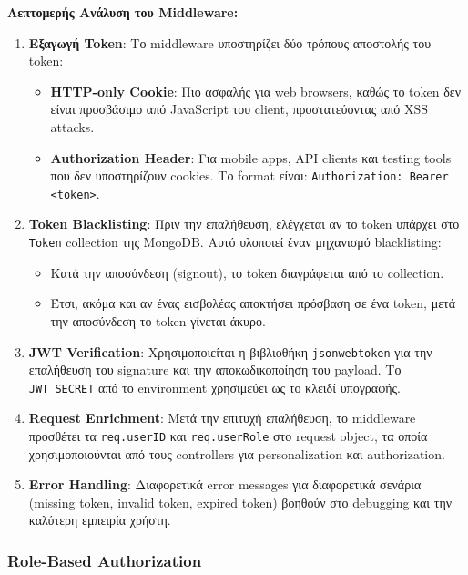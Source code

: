 \documentclass[a4paper,12pt]{article}
\begin{document}
\textbf{Λεπτομερής Ανάλυση του Middleware:}

\begin{enumerate}
    \item \textbf{Εξαγωγή Token}: Το middleware υποστηρίζει δύο τρόπους αποστολής του token:
    \begin{itemize}
        \item \textbf{HTTP-only Cookie}: Πιο ασφαλής για web browsers, καθώς το token δεν είναι προσβάσιμο από JavaScript του client, προστατεύοντας από XSS attacks.
        \item \textbf{Authorization Header}: Για mobile apps, API clients και testing tools που δεν υποστηρίζουν cookies. Το format είναι: \texttt{Authorization: Bearer <token>}.
    \end{itemize}
    
    \item \textbf{Token Blacklisting}: Πριν την επαλήθευση, ελέγχεται αν το token υπάρχει στο \texttt{Token} collection της MongoDB. Αυτό υλοποιεί έναν μηχανισμό blacklisting:
    \begin{itemize}
        \item Κατά την αποσύνδεση (signout), το token διαγράφεται από το collection.
        \item Έτσι, ακόμα και αν ένας εισβολέας αποκτήσει πρόσβαση σε ένα token, μετά την αποσύνδεση το token γίνεται άκυρο.
    \end{itemize}
    
    \item \textbf{JWT Verification}: Χρησιμοποιείται η βιβλιοθήκη \texttt{jsonwebtoken} για την επαλήθευση του signature και την αποκωδικοποίηση του payload. Το \texttt{JWT\_SECRET} από το environment χρησιμεύει ως το κλειδί υπογραφής.
    
    \item \textbf{Request Enrichment}: Μετά την επιτυχή επαλήθευση, το middleware προσθέτει τα \texttt{req.userID} και \texttt{req.userRole} στο request object, τα οποία χρησιμοποιούνται από τους controllers για personalization και authorization.
    
    \item \textbf{Error Handling}: Διαφορετικά error messages για διαφορετικά σενάρια (missing token, invalid token, expired token) βοηθούν στο debugging και την καλύτερη εμπειρία χρήστη.
\end{enumerate}

\subsubsection{Role-Based Authorization}
\end{document}
